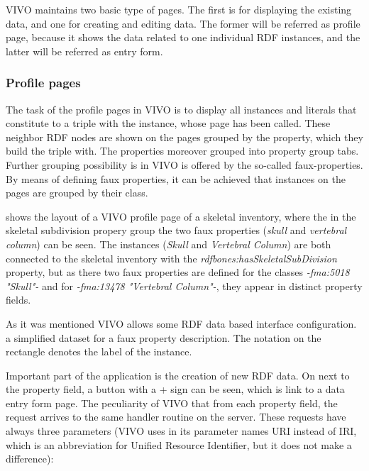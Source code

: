 VIVO maintains two basic type of pages. The first is for displaying the existing data, and one for creating and editing data. The former will be referred as profile page, because it shows the data related to one individual RDF instances, and the latter will be referred as entry form. 

\subsubsection{Profile pages} \label{vivoPp}


The task of the profile pages in VIVO is to display all instances and literals that constitute to a triple with the instance, whose page has been called. These neighbor RDF nodes are shown on the pages grouped by the property, which they build the triple with. The properties moreover grouped into property group tabs. Further grouping possibility is in VIVO is offered by the so-called faux-properties. By means of defining faux properties, it can be achieved that instances on the pages are grouped by their class. 


 shows the layout of a VIVO profile page of a skeletal inventory, where the in the skeletal subdivision propery group the two faux properties (\textit{skull} and \textit{vertebral column}) can be seen. The instances (\textit{Skull} and \textit{Vertebral Column}) are both connected to the skeletal inventory with the \textit{rdfbones:hasSkeletalSubDivision} property, but as there two faux properties are defined for the classes \textit{-fma:5018 "Skull"-} and for \textit{-fma:13478 "Vertebral Column"-}, they appear in distinct property fields.

As it was mentioned VIVO allows some RDF data based interface configuration.  a simplified dataset for a faux property description. The notation on the rectangle denotes the label of the instance.


Important part of the application is the creation of new RDF data. On  next to the property field, a button with a + sign can be seen, which is link to a data entry form page. The peculiarity of VIVO that from each property field, the request arrives to the same handler routine on the server. These requests have always three parameters (VIVO uses in its parameter names URI instead of IRI, which is an abbreviation for Unified Resource Identifier, but it does not make a difference):

